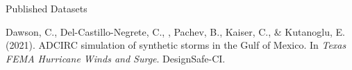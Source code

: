 \begin{rSection}{Published Datasets}
\begin{pubs}
    \item Dawson, C., Del-Castillo-Negrete, C., \me, Pachev, B., Kaiser, C., \& Kutanoglu, E. (2021). ADCIRC simulation of synthetic storms in the Gulf of Mexico. In \textit{Texas FEMA Hurricane Winds and Surge}. DesignSafe-CI. 
\end{pubs}
\end{rSection}

